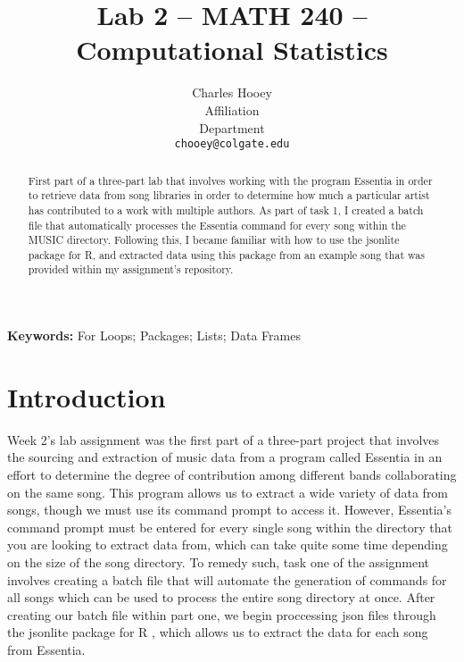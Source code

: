 \documentclass{article}\usepackage[]{graphicx}\usepackage[]{xcolor}
\begin{document}
\vspace{-1in}
\title{Lab 2 -- MATH 240 -- Computational Statistics}

\author{
  Charles Hooey \\
  Affiliation  \\
  Department  \\
  {\tt chooey@colgate.edu}
}

\date{}

\maketitle

\begin{multicols}{2}
\begin{abstract}
First part of a three-part lab that involves working with the program Essentia in order to retrieve data from song libraries in order to determine how much a particular artist has contributed to a work with multiple authors. As part of task 1, I created a batch file that automatically processes the Essentia command for every song within the MUSIC directory. Following this, I became familiar with how to use the jsonlite package for R, and extracted data using this package from an example song that was provided within my assignment's repository.
\end{abstract}

\noindent \textbf{Keywords:} For Loops; Packages; Lists; Data Frames

\section{Introduction}
Week 2's lab assignment was the first part of a three-part project that involves the sourcing and extraction of music data from a program called Essentia in an effort to determine the degree of contribution among different bands collaborating on the same song.  This program allows us to extract a wide variety of data from songs, though we must use its command prompt to access it. However, Essentia's command prompt must be entered for every single song within the directory that you are looking to extract data from, which can take quite some time depending on the size of the song directory. To remedy such, task one of the assignment involves creating a batch file that will automate the generation of commands for all songs which can be used to process the entire song directory at once. After creating our batch file within part one, we begin proccessing json files through the jsonlite package for R \citep{jsonlite}, which allows us to extract the data for each song from Essentia.




\end{multicols}
\end{document}
